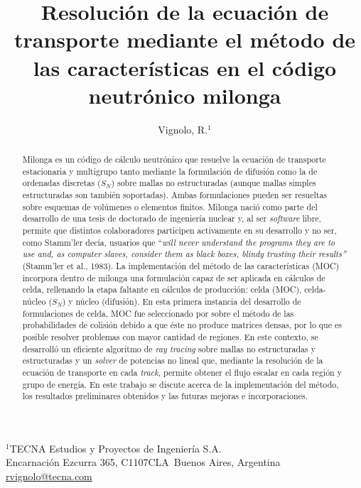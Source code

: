 \documentclass[11pt]{article}
\makeatletter
\numberwithin{equation}{section}
\def\affiliation#1{\def\@affiliation{#1}}
\def\maketitle{%
\thispagestyle{empty}

\null
\vspace{0.5cm plus 0.5cm minus 0.5cm}

\begin{center}
\begin{minipage}{0.8\linewidth}
\begin{center}
\Large{\textbf{\textsc{\@title}}}

\vspace{0.75cm plus 0.2cm minus 0.1cm}

\large{\@author}

\vspace{1.25cm plus 0.25cm minus 0.25cm}

\small{\@affiliation}
\vspace{1cm plus 0.2cm minus 0.2cm}

\end{center}
\end{minipage}
\end{center}

}
\makeatother
\begin{document}
\title{Resolución de la ecuación de transporte mediante el método de las características en el código neutrónico milonga}
\author{Vignolo, R.$^{1}$}
\affiliation{%
$^1$TECNA Estudios y Proyectos de Ingeniería S.A.\\
Encarnaci\'on Ezcurra 365, C1107CLA~Buenos Aires, Argentina\\
\url{rvignolo@tecna.com}\\
}


\maketitle


\begin{abstract}
\noindent
Milonga es un código de cálculo neutrónico que resuelve la ecuación de transporte estacionaria y multigrupo tanto mediante la formulación de difusión como la de ordenadas discretas ($S_N$) sobre mallas no estructuradas (aunque mallas simples estructuradas son también soportadas). Ambas formulaciones pueden ser resueltas sobre esquemas de volúmenes o elementos finitos. Milonga nació como parte del desarrollo de una tesis de doctorado de ingeniería nuclear y, al ser \emph{software} libre, permite que distintos colaboradores participen activamente en su desarrollo y no ser, como Stamm'ler decía, usuarios que ``\emph{will never understand the programs they are to use and, as computer slaves, consider them as black boxes, blindy trusting their results''} (Stamm'ler et al., 1983). La implementación del método de las características (MOC) incorpora dentro de milonga una formulación capaz de ser aplicada en cálculos de celda, rellenando la etapa faltante en cálculos de producción: celda (MOC), celda-núcleo ($S_N$) y núcleo (difusión). En esta primera instancia del desarrollo de formulaciones de celda, MOC fue seleccionado por sobre el método de las probabilidades de colisión debido a que éste no produce matrices densas, por lo que es posible resolver problemas con mayor cantidad de regiones. En este contexto, se desarrolló un eficiente algoritmo de \emph{ray tracing} sobre mallas no estructuradas y estructuradas y un \emph{solver} de potencias no lineal que, mediante la resolución de la ecuación de transporte en cada \emph{track}, permite obtener el flujo escalar en cada región y grupo de energía. En este trabajo se discute acerca de la implementación del método, los resultados preliminares obtenidos y las futuras mejoras e incorporaciones.
\end{abstract}
\end{document}
